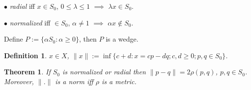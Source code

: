 \documentclass[12pt,letterpaper]{article}
\newtheorem{theorem}[lemma]{Theorem}
\newtheorem{definition}[lemma]{Definition}
\begin{document}
$\bullet$ \emph{radial} iff $x\in S_0$, $0\leq \lambda \leq 1$ $\implies$ $\lambda x\in S_0$.

$\bullet$ \emph{normalized} iff $\in S_0$, $\alpha \neq 1$ $\implies$ $\alpha x\notin S_0$.

Define $P:=\{ \alpha S_0: \alpha \geq 0\}$, then $P$ is a wedge.


\begin{definition}\label{de: basenorm} $x\in X$, $\|x\|:=\inf\{ c+d: x=cp-dq; c,d\geq 0; p,q\in S_0\}$.
\end{definition}

\begin{theorem} If $S_0$ is normalized or radial then $\|p-q\|=2\rho(p,q)$, $p,q\in S_0$. Moreover, $\|.\|$ is a norm iff $\rho$ is a metric.
\end{theorem}
\end{document}
